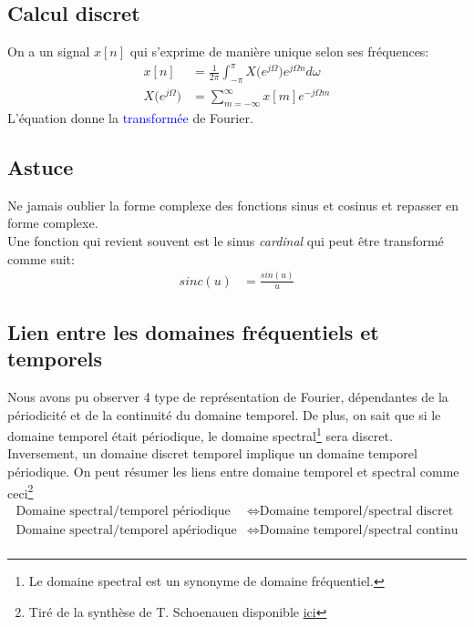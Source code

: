 \documentclass{report}
\begin{document}
\subsection{Calcul discret}
On a un signal $x[n]$ qui s'exprime de manière unique selon ses fréquences:
\begin{align}
x[n] &= \frac{1}{2\pi}\int_{-\pi}^{\pi} X \bigl(e^{j\Omega} \bigl) e^{j\Omega n} d\omega\\
X\bigl(e^{j\Omega} \bigl) &= \sum_{m=-\infty}^{\infty} x[m]e^{-j\Omega m} \label{eq:transfoDF}
\end{align}
L'équation \label{eq:transfoDF} donne la \textcolor{blue}{transformée} de Fourier.

\subsection{Astuce}
Ne jamais oublier la forme complexe des fonctions sinus et cosinus et repasser en forme complexe.\\
Une fonction qui revient souvent est le sinus \textit{cardinal} qui peut être transformé comme suit:
\begin{align*}
sinc(u) &= \frac{sin( u)}{ u}
\end{align*}

\subsection{Lien entre les domaines fréquentiels et temporels}
Nous avons pu observer 4 type de représentation de Fourier, dépendantes de la périodicité et de la continuité du domaine temporel. De plus, on sait que si le domaine temporel était périodique, le domaine spectral\footnote{Le domaine spectral est un synonyme de domaine fréquentiel.} sera discret. Inversement, un domaine discret temporel implique un domaine temporel périodique. On peut résumer les liens entre domaine temporel et spectral comme ceci\footnote{Tiré de la synthèse de T. Schoenauen disponible \href{https://www.overleaf.com/read/syckbmcpbscn}{ici}}
\begin{align*}
    \text{Domaine spectral/temporel périodique}  &\Leftrightarrow \text{Domaine temporel/spectral discret}\\
    \text{Domaine spectral/temporel apériodique} &\Leftrightarrow \text{Domaine temporel/spectral continu}\\
\end{align*}
\end{document}
